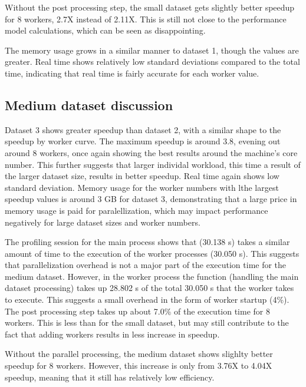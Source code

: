 Without the post processing step, the small dataset gets slightly better speedup for 8 workers, 2.7X instead of 2.11X. This is still not close to
the performance model calculations, which can be seen as disappointing.

The memory usage grows in a similar manner to dataset 1, though the values are greater.
Real time shows relatively low standard deviations compared to the total time, indicating that real time is fairly accurate for each worker
value.

\subsection{Medium dataset discussion}
Dataset 3 shows greater speedup than dataset 2, with a similar shape to the speedup by worker curve. The maximum speedup is
around 3.8, evening out around 8 workers, once again showing the best results around the machine's core number. This further suggests that larger
individal workload, this time a result of the larger dataset size, results in better speedup. Real time again shows
low standard deviation. Memory usage for the worker numbers with lthe largest speedup values is around 3 GB for dataset 3, demonstrating
that a large price in memory usage is paid for paralellization, which may impact performance negatively for large dataset sizes and
worker numbers.

The profiling session for the main process shows that  (30.138 s) takes a similar amount of time to the execution of
the worker processes (30.050 s). This suggests that parallelization overhead is not a major part of the execution time for the medium dataset.
However, in the worker process the  function (handling the main dataset processing) takes up 28.802 s of the total 30.050 s that the
worker takes to execute. This suggests a small overhead in the form of worker startup (4\%).
The post processing step takes up about 7.0\% of the execution time for 8 workers. This is less than for the small dataset, but may still contribute
to the fact that adding workers results in less increase in speedup.

Without the parallel processing, the medium dataset shows slighlty better speedup for 8 workers. However, this increase is only from 3.76X to 4.04X
speedup, meaning that it still has relatively low efficiency.

